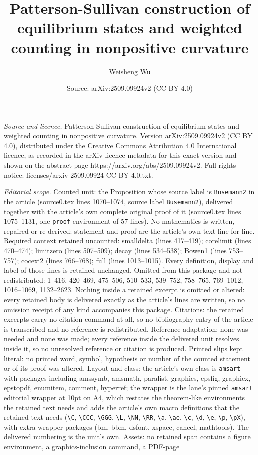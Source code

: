 \documentclass[10pt,a4paper]{amsart}
\title[Patterson-Sullivan construction of equilibrium states and we]{Patterson-Sullivan construction of equilibrium states and weighted counting in nonpositive curvature}
\author{Weisheng Wu}
\date{Source: arXiv:2509.09924v2 (CC BY 4.0)}
\begin{document}
\maketitle

\noindent\emph{Source and licence.} Patterson-Sullivan construction of equilibrium states and weighted counting in nonpositive curvature. Version arXiv:2509.09924v2 (CC BY 4.0), distributed under the Creative Commons Attribution 4.0 International licence, as recorded in the arXiv licence metadata for this exact version and shown on the abstract page https://arxiv.org/abs/2509.09924v2. Full rights notice: licenses/arxiv-2509.09924-CC-BY-4.0.txt.\par\smallskip

\noindent\textit{Editorial scope.} Counted unit: the Proposition whose source label is \texttt{Busemann2} in the article (source0.tex lines 1070--1074, source label \texttt{Busemann2}), delivered together with the article's own complete original proof of it (source0.tex lines 1075--1131, one \texttt{proof} environment of 57 lines). No mathematics is written, repaired or re-derived: statement and proof are the article's own text line for line. Required context retained uncounted: smalldelta (lines 417--419); corelimit (lines 470--474); limitzero (lines 507--509); decay (lines 534--538); Bowen1 (lines 753--757); cocexi2 (lines 766--768); full (lines 1013--1015). Every definition, display and label of those lines is retained unchanged. Omitted from this package and not redistributed: 1--416, 420--469, 475--506, 510--533, 539--752, 758--765, 769--1012, 1016--1069, 1132--2623. Nothing inside a retained excerpt is omitted or altered: every retained body is delivered exactly as the article's lines are written, so no omission receipt of any kind accompanies this package. Citations: the retained excerpts carry no citation command at all, so no bibliography entry of the article is transcribed and no reference is redistributed. Reference adaptation: none was needed and none was made; every reference inside the delivered unit resolves inside it, so no unresolved reference or citation is produced. Printed slips kept literal: no printed word, symbol, hypothesis or number of the counted statement or of its proof was altered. Layout and class: the article's own class is \texttt{amsart} with packages including amssymb, amsmath, paralist, graphics, epsfig, graphicx, epstopdf, enumitem, comment, hyperref; the wrapper is the lane's pinned \texttt{amsart} editorial wrapper at 10pt on A4, which restates the theorem-like environments the retained text needs and adds the article's own macro definitions that the retained text needs (\texttt{\textbackslash C}, \texttt{\textbackslash CCC}, \texttt{\textbackslash GGG}, \texttt{\textbackslash L}, \texttt{\textbackslash NN}, \texttt{\textbackslash RR}, \texttt{\textbackslash a}, \texttt{\textbackslash ae}, \texttt{\textbackslash c}, \texttt{\textbackslash d}, \texttt{\textbackslash e}, \texttt{\textbackslash p}, \texttt{\textbackslash pX}), with extra wrapper packages (bm, bbm, dsfont, xspace, cancel, mathtools). The delivered numbering is the unit's own. Assets: no retained span contains a figure environment, a graphics-inclusion command, a PDF-page 
\end{document}
